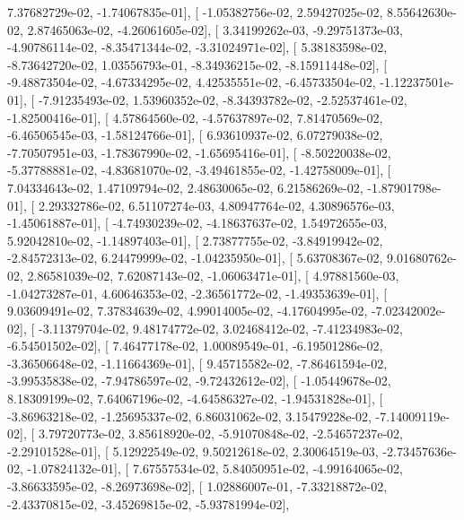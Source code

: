 \documentclass{article}
\begin{document}
          7.37682729e-02,  -1.74067835e-01],
       [ -1.05382756e-02,   2.59427025e-02,   8.55642630e-02,
          2.87465063e-02,  -4.26061605e-02],
       [  3.34199262e-03,  -9.29751373e-03,  -4.90786114e-02,
         -8.35471344e-02,  -3.31024971e-02],
       [  5.38183598e-02,  -8.73642720e-02,   1.03556793e-01,
         -8.34936215e-02,  -8.15911448e-02],
       [ -9.48873504e-02,  -4.67334295e-02,   4.42535551e-02,
         -6.45733504e-02,  -1.12237501e-01],
       [ -7.91235493e-02,   1.53960352e-02,  -8.34393782e-02,
         -2.52537461e-02,  -1.82500416e-01],
       [  4.57864560e-02,  -4.57637897e-02,   7.81470569e-02,
         -6.46506545e-03,  -1.58124766e-01],
       [  6.93610937e-02,   6.07279038e-02,  -7.70507951e-03,
         -1.78367990e-02,  -1.65695416e-01],
       [ -8.50220038e-02,  -5.37788881e-02,  -4.83681070e-02,
         -3.49461855e-02,  -1.42758009e-01],
       [  7.04334643e-02,   1.47109794e-02,   2.48630065e-02,
          6.21586269e-02,  -1.87901798e-01],
       [  2.29332786e-02,   6.51107274e-03,   4.80947764e-02,
          4.30896576e-03,  -1.45061887e-01],
       [ -4.74930239e-02,  -4.18637637e-02,   1.54972655e-03,
          5.92042810e-02,  -1.14897403e-01],
       [  2.73877755e-02,  -3.84919942e-02,  -2.84572313e-02,
          6.24479999e-02,  -1.04235950e-01],
       [  5.63708367e-02,   9.01680762e-02,   2.86581039e-02,
          7.62087143e-02,  -1.06063471e-01],
       [  4.97881560e-03,  -1.04273287e-01,   4.60646353e-02,
         -2.36561772e-02,  -1.49353639e-01],
       [  9.03609491e-02,   7.37834639e-02,   4.99014005e-02,
         -4.17604995e-02,  -7.02342002e-02],
       [ -3.11379704e-02,   9.48174772e-02,   3.02468412e-02,
         -7.41234983e-02,  -6.54501502e-02],
       [  7.46477178e-02,   1.00089549e-01,  -6.19501286e-02,
         -3.36506648e-02,  -1.11664369e-01],
       [  9.45715582e-02,  -7.86461594e-02,  -3.99535838e-02,
         -7.94786597e-02,  -9.72432612e-02],
       [ -1.05449678e-02,   8.18309199e-02,   7.64067196e-02,
         -4.64586327e-02,  -1.94531828e-01],
       [ -3.86963218e-02,  -1.25695337e-02,   6.86031062e-02,
          3.15479228e-02,  -7.14009119e-02],
       [  3.79720773e-02,   3.85618920e-02,  -5.91070848e-02,
         -2.54657237e-02,  -2.29101528e-01],
       [  5.12922549e-02,   9.50212618e-02,   2.30064519e-03,
         -2.73457636e-02,  -1.07824132e-01],
       [  7.67557534e-02,   5.84050951e-02,  -4.99164065e-02,
         -3.86633595e-02,  -8.26973698e-02],
       [  1.02886007e-01,  -7.33218872e-02,  -2.43370815e-02,
         -3.45269815e-02,  -5.93781994e-02],
\end{document}
